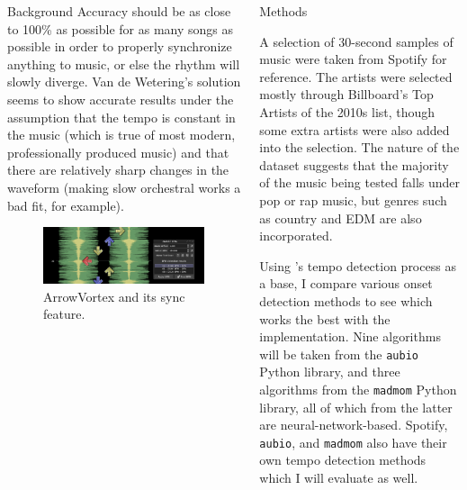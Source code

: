 \documentclass[xcolor={table,xdraw}]{beamer}       %
\begin{document}
\begin{frame}
\begin{columns}
\begin{column}{0.33\textwidth}
\begin{block}{Background}
        Accuracy should be as close to 100\% as possible for as many songs as
        possible in order to properly synchronize anything to music, or else the
        rhythm will slowly diverge. Van de Wetering’s solution seems to show
        accurate results under the assumption that the tempo is constant in the
        music (which is true of most modern, professionally produced music) and
        that there are relatively sharp changes in the waveform (making slow
        orchestral works a bad fit, for example).  

        \begin{figure}[h!]
          \centering
          \includegraphics[scale=1]{arrowvortex}
          \caption{ArrowVortex and its sync feature.}
          \label{fig:tag}
        \end{figure}

      \end{block}

    \end{column}


    \begin{column}{0.33\textwidth}
      \begin{block}{Methods}
        \setlength{\parindent}{1em}

        A selection of 30-second samples of music were taken from Spotify for
        reference. The artists were selected mostly through Billboard's Top
        Artists of the 2010s list, though some extra artists were also added
        into the selection. The nature of the dataset suggests that the majority
        of the music being tested falls under pop or rap music, but genres such
        as country and EDM are also incorporated.

        Using \citeauthor*{bram}'s tempo detection process as a base, I compare
        various onset detection methods to see which works the best with the
        implementation. Nine algorithms will be taken from the \texttt{aubio}
        Python library, and three algorithms from the \texttt{madmom} Python
        library, all of which from the latter are neural-network-based. Spotify,
        \texttt{aubio}, and \texttt{madmom} also have their own tempo detection
        methods which I will evaluate as well.
      \end{block}


\end{column}
\end{columns}
\end{frame}
\end{document}
